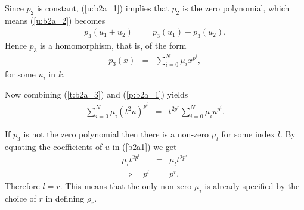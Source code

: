 Since $p_2$ is constant, (\ref{u:b2a_1}) implies that $p_2$ is the zero polynomial, which means (\ref{u:b2a_2}) becomes
\begin{eqnarray*}
p_3(u_1 + u_2) &=& p_3(u_1) + p_3(u_2). 
\end{eqnarray*}
Hence $p_3$ is a homomorphism, that is, of the form
\begin{eqnarray}
\label{p:b2a_1}
p_3(x) &=& \sum_{i=0}^N \mu_i x^{p^i},
\end{eqnarray}
for some $u_i$ in $k$.

Now combining (\ref{t:b2a_3}) and (\ref{p:b2a_1}) yields
\begin{eqnarray}
\label{b2a1}
\sum_{i=0}^N \mu_i (t^2u)^{p^i} &=& t^{2p^r}\sum_{i=0}^N \mu_i u^{p^i}.
\end{eqnarray}

If $p_3$ is not the zero polynomial then there is a non-zero $\mu_l$ for some index $l$. By equating the coefficients of $u$ in (\ref{b2a1}) we get
\begin{eqnarray*}
\mu_lt^{2p^l} &=& \mu_lt^{2p^r} \\
\Longrightarrow\quad p^l &=& p^r.
\end{eqnarray*}
Therefore $l=r$. This means that the only non-zero $\mu_i$ is already specified by the choice of $r$ in defining $\rho_r$. 

